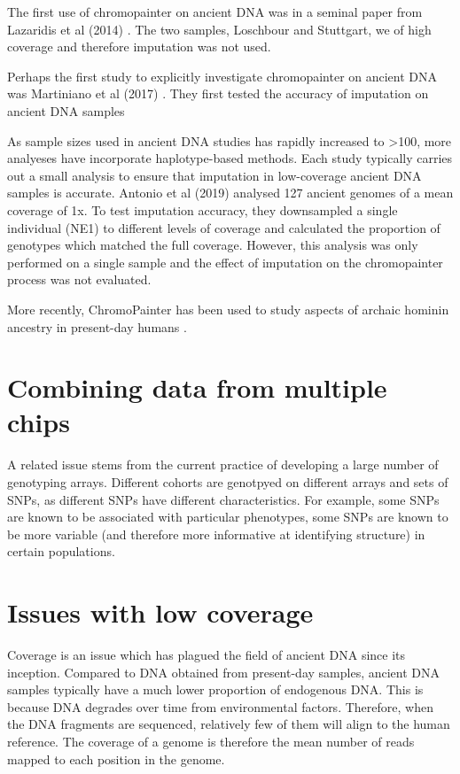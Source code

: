 The first use of chromopainter on ancient DNA was in a seminal paper from Lazaridis et al (2014) \cite{Lazaridis2014}. The two samples, Loschbour and Stuttgart, we of high coverage and therefore imputation was not used.

Perhaps the first study to explicitly investigate chromopainter on ancient DNA was Martiniano et al (2017) \cite{Martiniano2017}. They first tested the accuracy of imputation on ancient DNA samples 

As sample sizes used in ancient DNA studies has rapidly increased to >100, more analyeses have incorporate haplotype-based methods. Each study typically carries out a small analysis to ensure that imputation in low-coverage ancient DNA samples is accurate. Antonio et al (2019) \cite{antonio2019ancient} analysed 127 ancient genomes of a mean coverage of 1x. To test imputation accuracy, they downsampled a single individual (NE1) to different levels of coverage and calculated the proportion of genotypes which matched the full coverage. However, this analysis was only performed on a single sample and the effect of imputation on the chromopainter process was not evaluated. 

More recently, ChromoPainter has been used to study aspects of archaic hominin ancestry in present-day humans \cite{JACOBS20191010, teixeira2021widespread}. 

\section{Combining data from multiple chips}

A related issue stems from the current practice of developing a large number of genotyping arrays. Different cohorts are genotpyed on different arrays and sets of SNPs, as different SNPs have different characteristics. For example, some SNPs are known to be associated with particular phenotypes, some SNPs are known to be more variable (and therefore more informative at identifying structure) in certain populations.

\section{Issues with low coverage}

Coverage is an issue which has plagued the field of ancient DNA since its inception. Compared to DNA obtained from present-day samples, ancient DNA samples typically have a much lower proportion of endogenous DNA. This is because DNA degrades over time from environmental factors. Therefore, when the DNA fragments are sequenced, relatively few of them will align to the human reference. The coverage of a genome is therefore the mean number of reads mapped to each position in the genome. 

